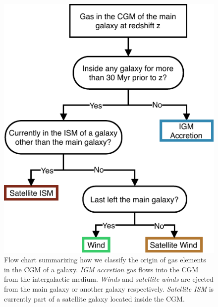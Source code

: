 \documentclass[fleqn,usenatbib]{mnras}
\begin{document}
\begin{figure}
\centering
\includegraphics[width=0.75\columnwidth]{figures/CGM_origins.pdf}
\caption{
Flow chart summarizing how we classify the origin of gas elements in the CGM of a galaxy. 
\textit{IGM accretion} gas flows into the CGM from the intergalactic medium.
\textit{Winds} and \textit{satellite winds} are ejected from the main galaxy or another galaxy respectively.
\textit{Satellite ISM} is currently part of a satellite galaxy located inside the CGM.
}
\label{fig:CGM_origins}
\end{figure}
\end{document}
